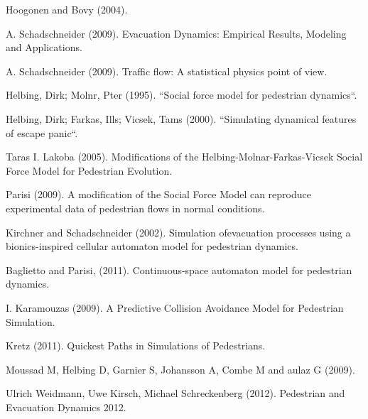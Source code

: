 \documentclass[english]{article}
\begin{document}
\newpage{}
\begin{thebibliography}{10}

 Hoogonen and Bovy (2004). 

 A. Schadschneider (2009). \textquotedbl{}Evacuation
Dynamics: Empirical Results, Modeling and Applications\textquotedbl{}. 

 A. Schadschneider (2009). \textquotedbl{}Traffic
flow: A statistical physics point of view\textquotedbl{}. 

 Helbing, Dirk; Molnr, Pter (1995). ``Social
force model for pedestrian dynamics``. 

 Helbing, Dirk; Farkas, Ills; Vicsek, Tams
(2000). ``Simulating dynamical features of escape panic``. 

 Taras I. Lakoba (2005). \textquotedbl{}Modifications
of the Helbing-Molnar-Farkas-Vicsek Social Force Model for Pedestrian
Evolution\textquotedbl{}. 

 Parisi (2009). \textquotedbl{}A modification
of the Social Force Model can reproduce experimental data of pedestrian
flows in normal conditions\textquotedbl{}. 

 Kirchner and Schadschneider (2002). \textquotedbl{}Simulation
ofevacuation processes using a bionics-inspired cellular automaton
model for pedestrian dynamics\textquotedbl{}. 

 Baglietto and Parisi, (2011). \textquotedbl{}Continuous-space
automaton model for pedestrian dynamics\textquotedbl{}. 

 I. Karamouzas (2009). \textquotedbl{}A Predictive
Collision Avoidance Model for Pedestrian Simulation\textquotedbl{}. 

 Kretz (2011). \textquotedbl{}Quickest Paths
in Simulations of Pedestrians\textquotedbl{}. 

 Moussad M, Helbing D, Garnier S, Johansson
A, Combe M and aulaz G (2009). 

 Ulrich Weidmann, Uwe Kirsch, Michael Schreckenberg
(2012). Pedestrian and Evacuation Dynamics 2012.\end{thebibliography}
\end{document}
